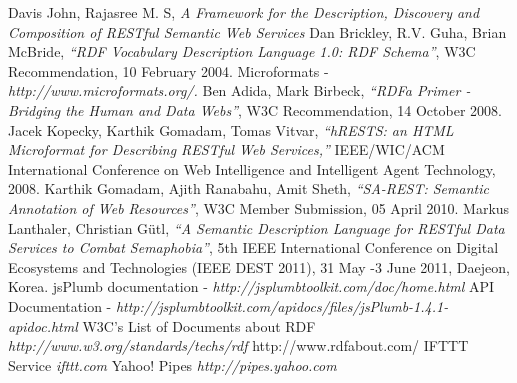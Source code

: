\documentclass[journal]{IEEEtran}
\begin{document}



\begin{thebibliography}{10}
    Davis John, Rajasree M. S,
    \emph{A Framework for the Description, Discovery and Composition of RESTful Semantic Web Services}
	Dan Brickley, R.V. Guha, Brian McBride,
	\emph{“RDF Vocabulary Description Language 1.0: 	RDF Schema”},
	W3C Recommendation, 10 February 2004.
	Microformats -
	\emph{http://www.microformats.org/.}
	Ben Adida, Mark Birbeck,
	\emph{“RDFa Primer - Bridging the Human and Data Webs”},
	W3C 	Recommendation, 14 October 2008.
	Jacek Kopecky, Karthik Gomadam, Tomas Vitvar,
	\emph{“hRESTS: an HTML Microformat for 	Describing RESTful Web Services,”} IEEE/WIC/ACM International Conference on Web 	Intelligence and Intelligent Agent Technology, 2008.
	Karthik Gomadam, Ajith Ranabahu, Amit Sheth,
	\emph{“SA-REST: Semantic Annotation of 	Web Resources”},
	W3C Member Submission, 05 April 2010.
	Markus Lanthaler, Christian Gütl,
	\emph{“A Semantic Description Language for RESTful Data 	Services to Combat Semaphobia”},
	5th IEEE International Conference on Digital 	Ecosystems and Technologies (IEEE DEST 2011), 31 May -3 June 2011, Daejeon, Korea.
	jsPlumb documentation -
	\emph{http://jsplumbtoolkit.com/doc/home.html}
	API Documentation -
	\emph{http://jsplumbtoolkit.com/apidocs/files/jsPlumb-1.4.1-apidoc.html}
	W3C's List of Documents about RDF
	\emph{http://www.w3.org/standards/techs/rdf}
	http://www.rdfabout.com/
	IFTTT Service
	\emph{ifttt.com}
	Yahoo! Pipes
	\emph{http://pipes.yahoo.com}

\end{thebibliography}


\end{document}
